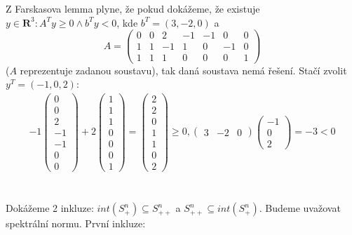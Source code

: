 \documentclass[12pt, a4paper]{article}
\begin{document}
\section{}
Z Farskasova lemma plyne, že pokud dokážeme, že existuje $y \in \mathbf{R}^3: A^T y \geq 0 \land b^T y < 0$, kde $b^T = (3, -2, 0)$ a 
\[
A = \begin{pmatrix}
0 & 0 & 2 & -1 & -1 & 0 & 0\\
1 & 1 & -1 & 1 & 0 & -1 & 0 \\
1 & 1 & 1 & 0 & 0 & 0 & 1
\end{pmatrix}
\]
($A$ reprezentuje zadanou soustavu), tak daná soustava nemá řešení. Stačí zvolit\\
$y^T = (-1, 0, 2)$:
\begin{gather*}
-1\begin{pmatrix}
0\\
0\\
2\\
-1\\
-1\\
0\\
0
\end{pmatrix} + 
2\begin{pmatrix}
1\\
1\\
1\\
0\\
0\\
0\\
1
\end{pmatrix} = 
\begin{pmatrix}
2\\
2\\
0\\
1\\
1\\
0\\
2
\end{pmatrix} \geq 0, \begin{pmatrix}3 & -2 & 0\end{pmatrix} \begin{pmatrix}
-1\\
0\\
2
\end{pmatrix} = -3 < 0
\end{gather*}

\section{}
Dokážeme 2 inkluze: $int(S^n_+) \subseteq S^n_{++}$ a $S^n_{++} \subseteq int(S^n_+)$. Budeme uvažovat spektrální normu. První inkluze:
\end{document}

